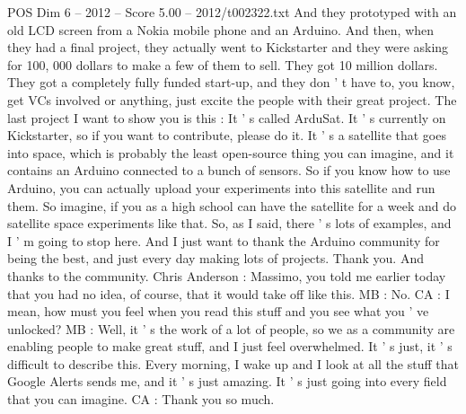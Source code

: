 \begin{textsample}{POS Dim 6 – 2012 – Score 5.00 – 2012/t002322.txt}
And they prototyped with an old LCD screen from a Nokia mobile phone and an Arduino.
And then, when they had a final project, they actually went to Kickstarter and they were asking for 100, 000 dollars to make a few of them to sell.
They got 10 million dollars.
They got a completely fully funded start-up, and they don ' t have to, you know, get VCs involved or anything, just excite the people with their great project.
The last project I want to show you is this : It ' s called ArduSat.
It ' s currently on Kickstarter, so if you want to contribute, please do it.
It ' s a satellite that goes into space, which is probably the least open-source thing you can imagine, and it contains an Arduino connected to a bunch of sensors.
So if you know how to use Arduino, you can actually upload your experiments into this satellite and run them.
So imagine, if you as a high school can have the satellite for a week and do satellite space experiments like that.
So, as I said, there ' s lots of examples, and I ' m going to stop here.
And I just want to thank the Arduino community for being the best, and just every day making lots of projects.
Thank you.
And thanks to the community.
Chris Anderson : Massimo, you told me earlier today that you had no idea, of course, that it would take off like this.
MB : No.
CA : I mean, how must you feel when you read this stuff and you see what you ' ve unlocked?
MB : Well, it ' s the work of a lot of people, so we as a community are enabling people to make great stuff, and I just feel overwhelmed.
It ' s just, it ' s difficult to describe this.
Every morning, I wake up and I look at all the stuff that Google Alerts sends me, and it ' s just amazing.
It ' s just going into every field that you can imagine.
CA : Thank you so much.

\end{textsample}
